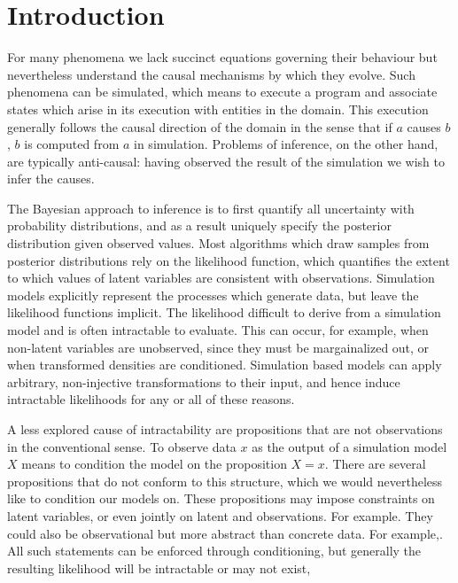 \section{Introduction}

For many phenomena we lack succinct equations governing their behaviour but nevertheless understand the causal mechanisms by which they evolve.
Such phenomena can be simulated, which means to execute a program and associate states which arise in its execution with entities in the domain.
This execution generally follows the causal direction of the domain in the sense that if $a$ causes $b$, $b$ is computed from $a$ in simulation.
Problems of inference, on the other hand, are typically anti-causal: having observed the result of the simulation we wish to infer the causes.



The Bayesian approach to inference is to first quantify all uncertainty with probability distributions, and as a result uniquely specify the posterior distribution given observed values.
Most algorithms which draw samples from posterior distributions rely on
the likelihood function, which quantifies the extent to which values of latent variables are consistent with observations.
Simulation models explicitly represent the processes which generate data, but leave the likelihood functions implicit. 
The likelihood  difficult to derive from a simulation model and is often intractable to evaluate.
This can occur, for example, when non-latent variables are unobserved, since they must be margainalized out, or when transformed densities are conditioned.
Simulation based models can apply arbitrary, non-injective transformations to their input, and hence induce intractable likelihoods for any or all of these reasons.

A less explored cause of intractability are propositions that are not observations in the conventional sense.
To observe data $x$ as the output of a simulation model $X$ means to condition the model on the proposition $X = x$.
There are several propositions that do not conform to this structure, which we would nevertheless like to condition our models on.
These propositions may impose constraints on latent variables, or even jointly on latent and observations.
For example.
They could also be observational but more abstract than concrete data.
For example,.
All such statements can be enforced through conditioning, but generally the resulting likelihood will be intractable or may not exist,

